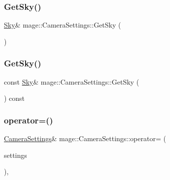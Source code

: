 \hypertarget{classmage_1_1_camera_settings_add70e097b67b2a181eb61b2b8f1263e0}{}\label{classmage_1_1_camera_settings_add70e097b67b2a181eb61b2b8f1263e0} 
\subsubsection{\texorpdfstring{Get\+Sky()}{GetSky()}\hspace{0.1cm}{\footnotesize\ttfamily [1/2]}}
{\footnotesize\ttfamily \hyperlink{classmage_1_1_sky}{Sky}\& mage\+::\+Camera\+Settings\+::\+Get\+Sky (\begin{DoxyParamCaption}{ }\end{DoxyParamCaption})\hspace{0.3cm}{\ttfamily [noexcept]}}

\hypertarget{classmage_1_1_camera_settings_a538464550850914bc531ba7b12515ce1}{}\label{classmage_1_1_camera_settings_a538464550850914bc531ba7b12515ce1} 
\subsubsection{\texorpdfstring{Get\+Sky()}{GetSky()}\hspace{0.1cm}{\footnotesize\ttfamily [2/2]}}
{\footnotesize\ttfamily const \hyperlink{classmage_1_1_sky}{Sky}\& mage\+::\+Camera\+Settings\+::\+Get\+Sky (\begin{DoxyParamCaption}{ }\end{DoxyParamCaption}) const\hspace{0.3cm}{\ttfamily [noexcept]}}

\hypertarget{classmage_1_1_camera_settings_a970b1250eaef3a47cd0264d15a114db5}{}\label{classmage_1_1_camera_settings_a970b1250eaef3a47cd0264d15a114db5} 
\subsubsection{\texorpdfstring{operator=()}{operator=()}\hspace{0.1cm}{\footnotesize\ttfamily [1/2]}}
{\footnotesize\ttfamily \hyperlink{classmage_1_1_camera_settings}{Camera\+Settings}\& mage\+::\+Camera\+Settings\+::operator= (\begin{DoxyParamCaption}\item[{const \hyperlink{classmage_1_1_camera_settings}{Camera\+Settings} \&}]{settings }\end{DoxyParamCaption})\hspace{0.3cm}{\ttfamily [default]}, {\ttfamily [noexcept]}}

